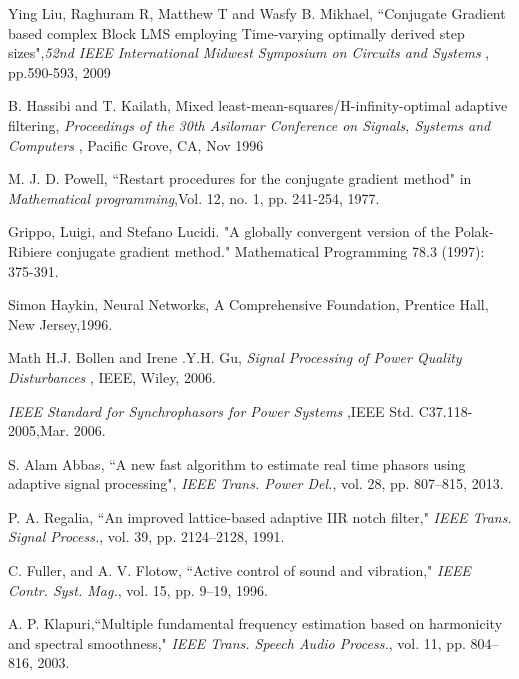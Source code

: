 \documentclass{UCF_ETD}
\begin{document}
\begin{thebibliography}{99}
Ying Liu, Raghuram R, Matthew T and Wasfy B. Mikhael, ``Conjugate Gradient based complex Block LMS employing Time-varying optimally derived step sizes",\emph{52nd IEEE International Midwest Symposium on Circuits and Systems} , pp.590-593, 2009

B. Hassibi and T. Kailath, Mixed least-mean-squares/H-infinity-optimal adaptive filtering, \emph{Proceedings of the 30th Asilomar Conference on Signals, Systems and Computers} , Pacific Grove, CA, Nov 1996


M. J. D. Powell, ``Restart procedures for the conjugate gradient method" in \emph{Mathematical programming},Vol. 12, no. 1, pp. 241-254, 1977.

Grippo, Luigi, and Stefano Lucidi. "A globally convergent version of the Polak-Ribiere conjugate gradient method." Mathematical Programming 78.3 (1997): 375-391.

Simon Haykin, Neural Networks, A Comprehensive Foundation, Prentice Hall, New Jersey,1996.

Math H.J. Bollen and Irene .Y.H. Gu, \emph{Signal Processing of Power Quality Disturbances} , IEEE, Wiley, 2006.

\emph{IEEE Standard for Synchrophasors for Power Systems} ,IEEE Std. C37.118-2005,Mar. 2006.

S. Alam Abbas, ``A new fast algorithm to estimate real time phasors using adaptive signal processing",  \emph{IEEE Trans. Power Del.}, vol. 28, pp. 807--815,  2013.





P. A. Regalia, ``An improved lattice-based adaptive IIR notch filter," \emph{IEEE Trans. Signal Process.}, vol. 39, pp. 2124--2128,  1991.

C. Fuller, and A. V. Flotow, ``Active control of sound and vibration," \emph{IEEE Contr. Syst. Mag.}, vol. 15, pp. 9--19, 1996.

A. P. Klapuri,``Multiple fundamental frequency estimation based on harmonicity and spectral smoothness," \emph{IEEE Trans. Speech Audio Process.}, vol. 11, pp. 804--816, 2003.


\end{thebibliography}
\end{document}
